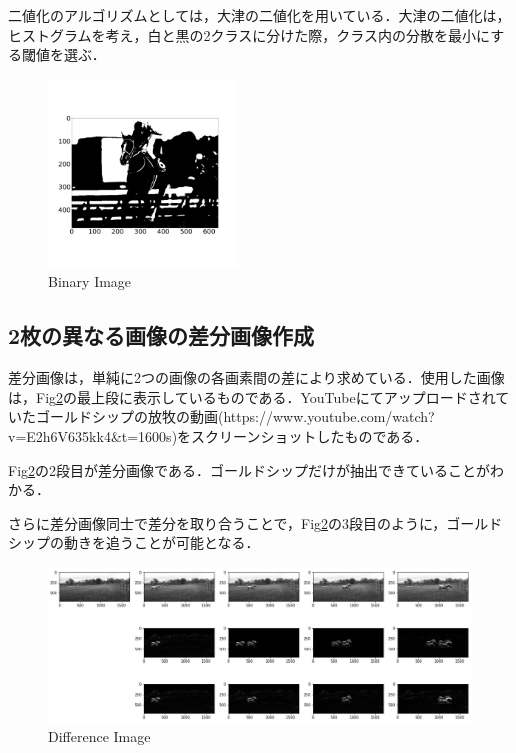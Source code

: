 \documentclass[11pt,a4j]{jarticle}
\begin{document}
二値化のアルゴリズムとしては，大津の二値化を用いている．大津の二値化は，ヒストグラムを考え，白と黒の2クラスに分けた際，クラス内の分散を最小にする閾値を選ぶ．
\begin{figure}[ht]
	\centering
	\includegraphics[width=5cm]{../1_BasicImageProcessing/output/img2.jpg}
	\vspace{-1cm}
	\renewcommand{\figurename}{Fig}
	\caption{Binary Image}
	\label{img2}
\end{figure}

\subsection{2枚の異なる画像の差分画像作成}
差分画像は，単純に2つの画像の各画素間の差により求めている．使用した画像は，Fig\ref{diff_img}の最上段に表示しているものである．YouTubeにてアップロードされていたゴールドシップの放牧の動画(https://www.youtube.com/watch?v=E2h6V635kk4\&t=1600s)をスクリーンショットしたものである．

Fig\ref{diff_img}の2段目が差分画像である．ゴールドシップだけが抽出できていることがわかる．

さらに差分画像同士で差分を取り合うことで，Fig\ref{diff_img}の3段目のように，ゴールドシップの動きを追うことが可能となる．

\begin{figure}[ht]
	\centering
	\includegraphics[width=\linewidth]{../1_BasicImageProcessing/output/diff_img.jpg}
	\renewcommand{\figurename}{Fig}
	\caption{Difference Image}
	\label{diff_img}
\end{figure}
\end{document}
